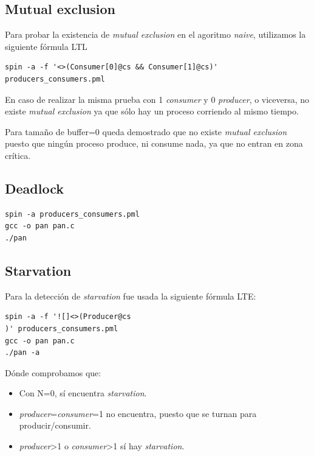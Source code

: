 \documentclass[a4paper,12pt]{article}
\begin{document}
\subsection{Mutual exclusion}
Para probar la existencia de \textit{mutual exclusion} en el agoritmo \textit{naive}, utilizamos la siguiente fórmula LTL

\begin{lstlisting}
spin -a -f '<>(Consumer[0]@cs && Consumer[1]@cs)' 
producers_consumers.pml
\end{lstlisting}

En caso de realizar la misma prueba con 1 \textit{consumer} y 0 \textit{producer}, o viceversa, no existe \textit{mutual exclusion} ya que sólo hay un proceso corriendo al mismo tiempo.

Para tamaño de buffer=0 queda demostrado que no existe \textit{mutual exclusion} puesto que ningún proceso produce, ni consume nada, ya que no entran en zona crítica.

\subsection{Deadlock}

\begin{lstlisting}
spin -a producers_consumers.pml
gcc -o pan pan.c 
./pan
\end{lstlisting}

\subsection{Starvation}

Para la detección de \textit{starvation} fue usada la siguiente fórmula LTE: 

\begin{lstlisting}
spin -a -f '![]<>(Producer@cs
)' producers_consumers.pml
gcc -o pan pan.c
./pan -a
\end{lstlisting}

Dónde comprobamos que:

\begin{itemize}
\item Con N=0, sí encuentra \textit{starvation}.
\item \textit{producer}=\textit{consumer}=1 no encuentra, puesto que se turnan para producir/consumir.
\item \textit{producer}\textgreater 1 o \textit{consumer}\textgreater 1 sí hay \textit{starvation}.
\end{itemize}
\end{document}
